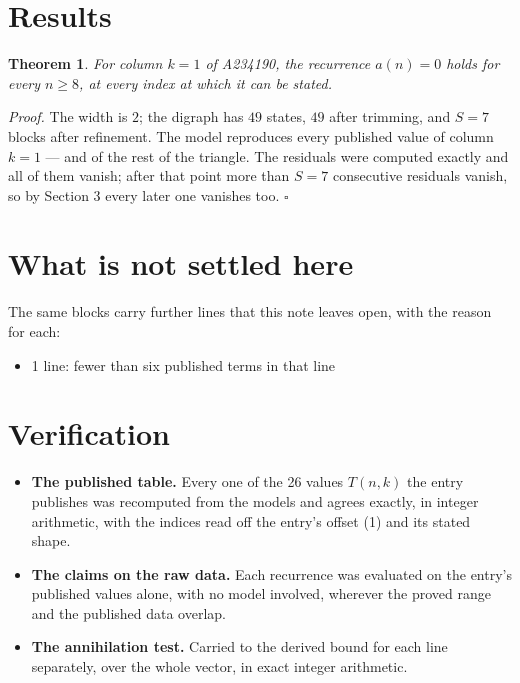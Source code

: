 \documentclass[11pt]{article}
\newtheorem{theorem}{Theorem}
\theoremstyle{definition}
\begin{document}
\section{Results}

\begin{theorem} For column $k = 1$ of A234190, the recurrence $a(n) = 0$ holds for every $n \ge 8$, at every index at which it can be stated.\end{theorem}

{\itshape Proof.} The width is $2$; the digraph has $49$ states, $49$ after trimming, and $S = 7$ blocks after refinement. The model reproduces every published value of column $k = 1$ --- and of the rest of the triangle. The residuals were computed exactly and all of them vanish; after that point more than $S = 7$ consecutive residuals vanish, so by Section 3 every later one vanishes too. $\square$

\section{What is not settled here}

The same blocks carry further lines that this note leaves open, with the reason for each:

\begin{itemize}

\item 1 line: fewer than six published terms in that line

\end{itemize}

\section{Verification}

\begin{itemize}

\item {\bfseries The published table.} Every one of the 26 values $T(n,k)$ the entry publishes was recomputed from the models and agrees exactly, in integer arithmetic, with the indices read off the entry's offset (1) and its stated shape.

\item {\bfseries The claims on the raw data.} Each recurrence was evaluated on the entry's published values alone, with no model involved, wherever the proved range and the published data overlap.

\item {\bfseries The annihilation test.} Carried to the derived bound for each line separately, over the whole vector, in exact integer arithmetic.

\end{itemize}
\end{document}

